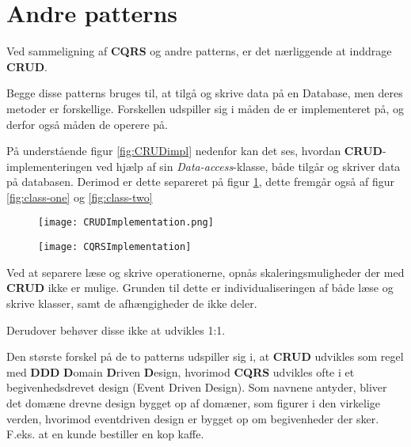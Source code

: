 \section{Andre patterns}
Ved sammeligning af \textbf{CQRS} og andre patterns, er det nærliggende at inddrage \textbf{CRUD}.

Begge disse patterns bruges til, at tilgå og skrive data på en Database, men deres metoder er forskellige. Forskellen udspiller sig i måden de er implementeret på, og derfor også måden de operere på.\newline

På understående figur \ref{fig:CRUDimpl} nedenfor kan det ses, hvordan \textbf{CRUD}-implementeringen ved hjælp af sin \textit{Data-access}-klasse, både tilgår og skriver data på databasen. Derimod er dette separeret på figur \ref{fig:CQRSimpl}, dette fremgår også af figur \ref{fig:class-one} og \ref{fig:class-two}

\begin{figure}[H]
	\centering
	\begin{minipage}{.5\textwidth}
		\centering
		\texttt{[image: CRUDImplementation.png]}
		\label{fig:CRUDimpl}
	\end{minipage}%
	\begin{minipage}{.5\textwidth}
		\centering
		\texttt{[image: CQRSImplementation]}
		\label{fig:CQRSimpl}
	\end{minipage}
\end{figure}


Ved at separere læse og skrive operationerne, opnås skaleringsmuligheder der med \textbf{CRUD} ikke er mulige. Grunden til dette er individualiseringen af både læse og skrive klasser, samt de afhængigheder de ikke deler.\newline

Derudover behøver disse ikke at udvikles 1:1.\newline

Den største forskel på de to patterns udspiller sig i, at \textbf{CRUD} udvikles som regel med \textbf{DDD} \textbf{D}omain \textbf{D}riven \textbf{D}esign, hvorimod \textbf{CQRS} udvikles ofte i et begivenhedsdrevet design (Event Driven Design). Som navnene antyder, bliver det domæne drevne design bygget op af domæner, som figurer i den virkelige verden, hvorimod eventdriven design er bygget op om begivenheder der sker. F.eks. at en kunde bestiller en kop kaffe.

